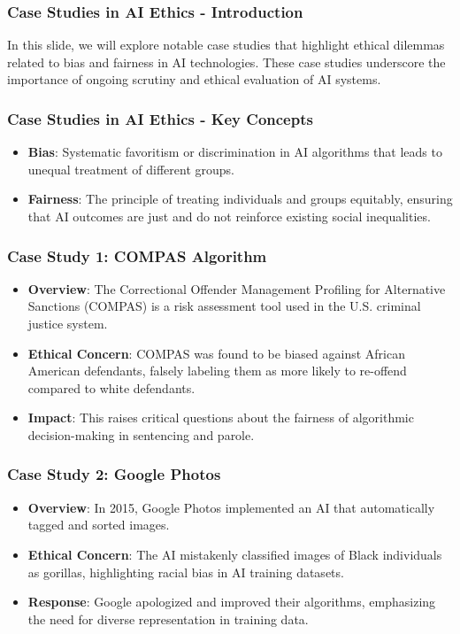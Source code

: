\documentclass{beamer}
\begin{document}
\begin{frame}[fragile]
    \frametitle{Case Studies in AI Ethics - Introduction}
    In this slide, we will explore notable case studies that highlight ethical dilemmas related to bias and fairness in AI technologies. 
    These case studies underscore the importance of ongoing scrutiny and ethical evaluation of AI systems.
\end{frame}

\begin{frame}[fragile]
    \frametitle{Case Studies in AI Ethics - Key Concepts}
    \begin{itemize}
        \item \textbf{Bias}: Systematic favoritism or discrimination in AI algorithms that leads to unequal treatment of different groups.
        \item \textbf{Fairness}: The principle of treating individuals and groups equitably, ensuring that AI outcomes are just and do not reinforce existing social inequalities.
    \end{itemize}
\end{frame}

\begin{frame}[fragile]
    \frametitle{Case Study 1: COMPAS Algorithm}
    \begin{itemize}
        \item \textbf{Overview}: The Correctional Offender Management Profiling for Alternative Sanctions (COMPAS) is a risk assessment tool used in the U.S. criminal justice system.
        \item \textbf{Ethical Concern}: COMPAS was found to be biased against African American defendants, falsely labeling them as more likely to re-offend compared to white defendants.
        \item \textbf{Impact}: This raises critical questions about the fairness of algorithmic decision-making in sentencing and parole.
    \end{itemize}
\end{frame}

\begin{frame}[fragile]
    \frametitle{Case Study 2: Google Photos}
    \begin{itemize}
        \item \textbf{Overview}: In 2015, Google Photos implemented an AI that automatically tagged and sorted images.
        \item \textbf{Ethical Concern}: The AI mistakenly classified images of Black individuals as gorillas, highlighting racial bias in AI training datasets.
        \item \textbf{Response}: Google apologized and improved their algorithms, emphasizing the need for diverse representation in training data.
    \end{itemize}
\end{frame}
\end{document}
